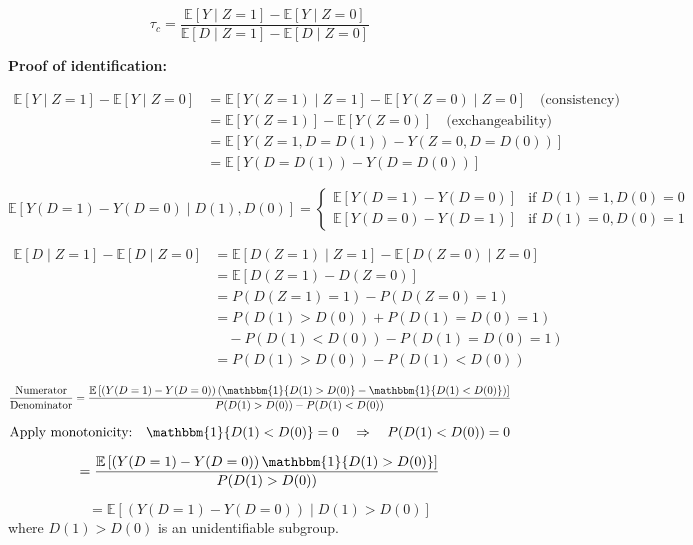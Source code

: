 \[
\tau_c = \frac{\mathbb{E}[Y \mid Z = 1] - \mathbb{E}[Y \mid Z = 0]}{\mathbb{E}[D \mid Z = 1] - \mathbb{E}[D \mid Z = 0]}
\]

\textbf{Proof of identification:}

\begin{align*}
\mathbb{E}[Y \mid Z = 1] - \mathbb{E}[Y \mid Z = 0] &= \mathbb{E}[Y(Z = 1) \mid Z = 1] - \mathbb{E}[Y(Z = 0) \mid Z = 0] \quad \text{(consistency)} \\
&= \mathbb{E}[Y(Z = 1)] - \mathbb{E}[Y(Z = 0)] \quad \text{(exchangeability)} \\
&= \mathbb{E}[Y(Z = 1, D = D(1)) - Y(Z = 0, D = D(0))] \\
&= \mathbb{E}[Y(D = D(1)) - Y(D = D(0))]
\end{align*}

\[
\mathbb{E}\left[ Y(D = 1) - Y(D = 0) \mid D(1), D(0) \right] =
\begin{cases}
    \mathbb{E}\left[ Y(D = 1) - Y(D = 0) \right] & \text{if } D(1) = 1, D(0) = 0 \\
    \mathbb{E}\left[ Y(D = 0) - Y(D = 1) \right] & \text{if } D(1) = 0, D(0) = 1
\end{cases}
\]

\begin{align*}
\mathbb{E}[D \mid Z = 1] - \mathbb{E}[D \mid Z = 0] &= \mathbb{E}[D(Z = 1) \mid Z = 1] - \mathbb{E}[D(Z = 0) \mid Z = 0] \\
&= \mathbb{E}[D(Z = 1) - D(Z = 0)] \\
&= P(D(Z = 1) = 1) - P(D(Z = 0) = 1) \\
&= P(D(1) > D(0)) + P(D(1) = D(0) = 1) \\
&\quad - P(D(1) < D(0)) - P(D(1) = D(0) = 1) \\
&= P(D(1) > D(0)) - P(D(1) < D(0))
\end{align*}

\[
\frac{\text{Numerator}}{\text{Denominator}} 
= \frac{\mathbb{E}\left[ (Y(D = 1) - Y(D = 0)) \left( \mathbbm{1}\{D(1) > D(0)\} - \mathbbm{1}\{D(1) < D(0)\} \right) \right]}{P(D(1) > D(0)) - P(D(1) < D(0))}
\]

\[
\text{Apply monotonicity:} \quad \mathbbm{1}\{D(1) < D(0)\} = 0 \quad \Rightarrow \quad P(D(1) < D(0)) = 0
\]


\[
= \frac{\mathbb{E}\left[ (Y(D = 1) - Y(D = 0)) \, \mathbbm{1}\{D(1) > D(0)\} \right]}{P(D(1) > D(0))}
\]

\[
= \mathbb{E}\left[ (Y(D = 1) - Y(D = 0)) \mid D(1) > D(0) \right]
\]
where \(D(1) > D(0)\) is an unidentifiable subgroup.

